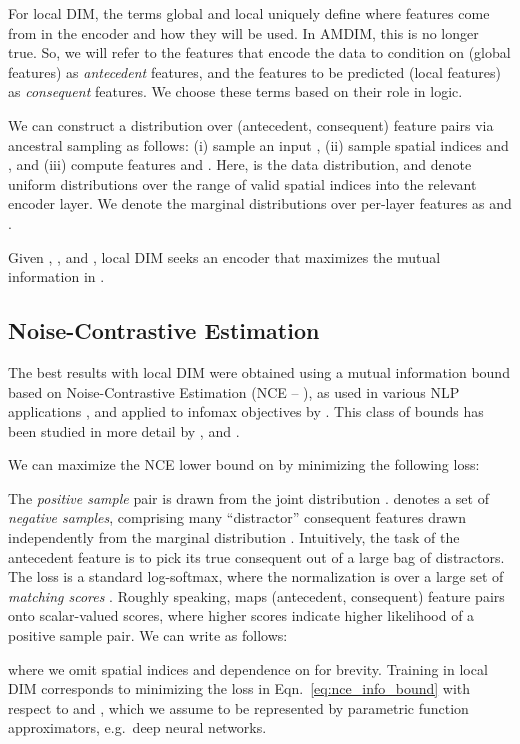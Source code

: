 \documentclass{article}
\begin{document}
For local DIM, the terms global and local uniquely define where features come from in the encoder and how they will be used.
In AMDIM, this is no longer true. So, we will refer to the features that encode the data to condition on (global features) as \emph{antecedent} features, and the features to be predicted (local features) as \emph{consequent} features. We choose these terms based on their role in logic.

We can construct a distribution  over (antecedent, consequent) feature pairs via ancestral sampling as follows: (i) sample an input , (ii) sample spatial indices  and , and (iii) compute features  and . Here,  is the data distribution, and  denote uniform distributions over the range of valid spatial indices into the relevant encoder layer. We denote the marginal distributions over per-layer features as  and .

Given , , and , local DIM seeks an encoder  that maximizes the mutual information  in .

\subsection{Noise-Contrastive Estimation}
The best results with local DIM were obtained using a mutual information bound based on Noise-Contrastive Estimation (NCE -- \citep{Gutmann2010}), as used in various NLP applications \citep{Ma2018}, and applied to infomax objectives by \citet{vandenOord2018}. This class of bounds has been studied in more detail by \cite{McAllester2018}, and \cite{Poole2019}.

We can maximize the NCE lower bound on  by minimizing the following loss:

The \emph{positive sample} pair  is drawn from the joint distribution .  denotes a set of \emph{negative samples}, comprising many ``distractor'' consequent features drawn independently from the marginal distribution . Intuitively, the task of the antecedent feature is to pick its true consequent out of a large bag of distractors. The loss  is a standard log-softmax, where the normalization is over a large set of \emph{matching scores} . Roughly speaking,  maps (antecedent, consequent) feature pairs onto scalar-valued scores, where higher scores indicate higher likelihood of a positive sample pair. We can write  as follows:

where we omit spatial indices and dependence on  for brevity. Training in local DIM corresponds to minimizing the loss in Eqn.~\ref{eq:nce_info_bound} with respect to  and , which we assume to be represented by parametric function approximators, e.g.~deep neural networks.
\end{document}
